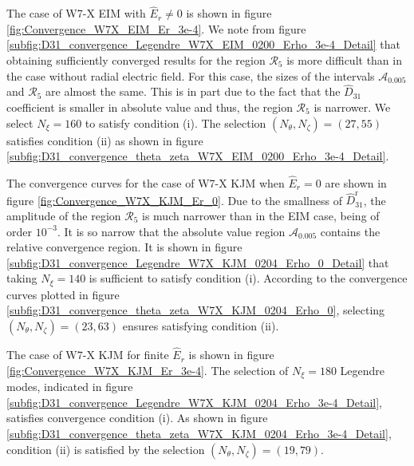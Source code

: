 \documentclass[10pt]{iopart}
\begin{document}
The case of W7-X EIM with $\widehat{E}_r\ne 0$ is shown in figure \ref{fig:Convergence_W7X_EIM_Er_3e-4}. We note from figure \ref{subfig:D31_convergence_Legendre_W7X_EIM_0200_Erho_3e-4_Detail} that obtaining sufficiently converged results for the region $\mathcal{R}_{5}$ is more difficult than in the case without radial electric field. For this case, the sizes of the intervals $\mathcal{A}_{0.005}$ and $\mathcal{R}_{5}$ are almost the same. This is in part due to the fact that the $\widehat{D}_{31}$ coefficient is smaller in absolute value and thus, the region $\mathcal{R}_{5}$ is narrower. We select $N_\xi=160$ to satisfy condition (i). The selection $(N_\theta,N_\zeta)=(27,55)$ satisfies condition (ii) as shown in figure \ref{subfig:D31_convergence_theta_zeta_W7X_EIM_0200_Erho_3e-4_Detail}. 

The convergence curves for the case of W7-X KJM when $\widehat{E}_r=0$ are shown in figure \ref{fig:Convergence_W7X_KJM_Er_0}. Due to the smallness of $\widehat{D}_{31}^{\text{r}}$, the amplitude of the region $\mathcal{R}_{5}$ is much narrower than in the EIM case, being of order $10^{-3}$. It is so narrow that the absolute value region $\mathcal{A}_{0.005}$ contains the relative convergence region. It is shown in figure \ref{subfig:D31_convergence_Legendre_W7X_KJM_0204_Erho_0_Detail} that taking $N_\xi=140$ is sufficient to satisfy condition (i). According to the convergence curves plotted in figure \ref{subfig:D31_convergence_theta_zeta_W7X_KJM_0204_Erho_0}, selecting $(N_\theta,N_\zeta)=(23,63)$ ensures satisfying condition (ii). 

The case of W7-X KJM for finite $\widehat{E}_r$ is shown in figure \ref{fig:Convergence_W7X_KJM_Er_3e-4}. The selection of $N_\xi=180$ Legendre modes, indicated in figure \ref{subfig:D31_convergence_Legendre_W7X_KJM_0204_Erho_3e-4_Detail}, satisfies convergence condition (i). As shown in figure \ref{subfig:D31_convergence_theta_zeta_W7X_KJM_0204_Erho_3e-4_Detail}, condition (ii) is satisfied by the selection $(N_\theta, N_\zeta)=(19,79)$. 
\end{document}
